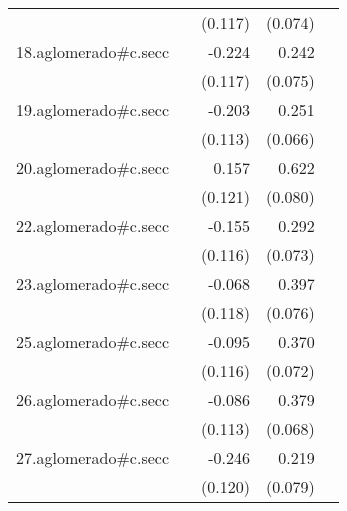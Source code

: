 {\begin{longtable}{l*{4}{D{.}{.}{-1}}}
            &                     &     (0.117)         &     (0.074)         &                     \\
\addlinespace
18.aglomerado#c.secc&                     &      -0.224         &       0.242\sym{**} &                     \\
            &                     &     (0.117)         &     (0.075)         &                     \\
\addlinespace
19.aglomerado#c.secc&                     &      -0.203         &       0.251\sym{***}&                     \\
            &                     &     (0.113)         &     (0.066)         &                     \\
\addlinespace
20.aglomerado#c.secc&                     &       0.157         &       0.622\sym{***}&                     \\
            &                     &     (0.121)         &     (0.080)         &                     \\
\addlinespace
22.aglomerado#c.secc&                     &      -0.155         &       0.292\sym{***}&                     \\
            &                     &     (0.116)         &     (0.073)         &                     \\
\addlinespace
23.aglomerado#c.secc&                     &      -0.068         &       0.397\sym{***}&                     \\
            &                     &     (0.118)         &     (0.076)         &                     \\
\addlinespace
25.aglomerado#c.secc&                     &      -0.095         &       0.370\sym{***}&                     \\
            &                     &     (0.116)         &     (0.072)         &                     \\
\addlinespace
26.aglomerado#c.secc&                     &      -0.086         &       0.379\sym{***}&                     \\
            &                     &     (0.113)         &     (0.068)         &                     \\
\addlinespace
27.aglomerado#c.secc&                     &      -0.246\sym{*}  &       0.219\sym{**} &                     \\
            &                     &     (0.120)         &     (0.079)         &                     \\

\end{longtable}}
